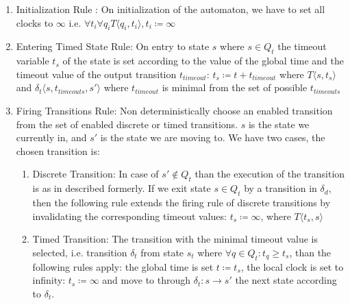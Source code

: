 			\begin{enumerate}
				\item Initialization Rule : On initialization of the automaton, we have to set all clocks to $\infty$ 
				i.e. $\forall t_i \forall q_i T \langle q_i, t_i \rangle, t_i \coloneqq \infty $
				
				\item Entering Timed State Rule: On entry to state $s$ where $s \in Q_t$ the timeout variable $t_s$ of the state is set according to the value of the global time and the timeout value of the output transition $t_{timeout}$:
					$t_s\coloneqq t+t_{timeout}$
					where $T\langle s,t_s \rangle$ and $\delta_t\langle s,t_{timeouts},s' \rangle$ where $t_{timeout}$ is minimal from the set of possible $t_{timeouts}$ 
				
				\item Firing Transitions Rule: Non deterministically choose an enabled transition from the set of enabled discrete or timed transitions. 
					$s$ is the state we currently in, and $s'$ is the state we are moving to.
					We have two cases, the chosen transition is:
					\begin{enumerate}
						\item Discrete Transition: In case of $s' \notin Q_t$ than the execution of the transition is as in described formerly. 
						If we exit state $s \in Q_t$ by a transition in $\delta_d$, 
						then the following rule extends the firing rule of discrete transitions by invalidating the corresponding timeout values:
							$t_s \coloneqq \infty$, where $T \langle t_s, s \rangle$
						\item Timed Transition: The transition with the minimal timeout value is selected, 
							i.e. transition $\delta_t$ from state $s_t$ where $\forall q \in Q_t: t_q \geq t_s$, than the following rules apply:
							the global time is set $t \coloneqq t_s$, the local clock is set to infinity: 
							$t_s \coloneqq \infty$ and move to through $\delta_t : s \rightarrow s'$ the next state according to $\delta_t$.
					\end{enumerate}			
			\end{enumerate}
		
